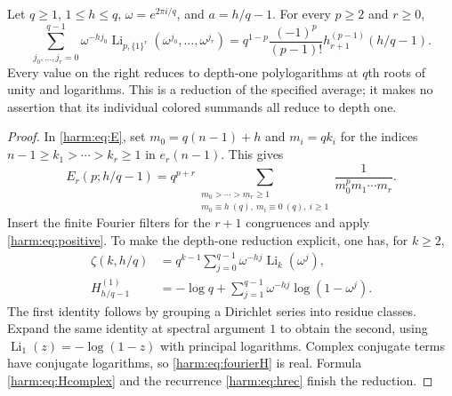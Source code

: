 \begin{corollary}
\label{harm:cor:cyclotomic}
Let $q\geq1$, $1\leq h\leq q$, $\omega=e^{2\pi i/q}$, and
$a=h/q-1$.  For every $p\geq2$ and $r\geq0$,
\begin{equation}\label{harm:eq:projection}
 \sum_{j_0,\ldots,j_r=0}^{q-1}\omega^{-hj_0}
 \operatorname{Li}_{p,\{1\}^r}
       (\omega^{j_0},\ldots,\omega^{j_r})
 =q^{1-p}\frac{(-1)^p}{(p-1)!}
            h_{r+1}^{(p-1)}(h/q-1).
\end{equation}
Every value on the right reduces to depth-one polylogarithms at
$q$th roots of unity and logarithms.  This is a reduction of the
specified average; it makes no assertion that its individual colored
summands all reduce to depth one.
\end{corollary}
\begin{proof}
In \eqref{harm:eq:E}, set $m_0=q(n-1)+h$ and $m_i=qk_i$ for the
indices $n-1\geq k_1>\cdots>k_r\geq1$ in $e_r(n-1)$.  This gives
\[
 E_r(p;h/q-1)=q^{p+r}
 \sum_{\substack{m_0>\cdots>m_r\geq1\\
                  m_0\equiv h\ (q),\ m_i\equiv0\ (q),\ i\geq1}}
 \frac1{m_0^p m_1\cdots m_r}.
\]
Insert the finite Fourier filters for the $r+1$ congruences and
apply \eqref{harm:eq:positive}.  To make the depth-one reduction
explicit, one has, for $k\geq2$,
\begin{align}
 \zeta(k,h/q)
 &=q^{k-1}\sum_{j=0}^{q-1}\omega^{-hj}
                       \operatorname{Li}_k(\omega^j),
                       \label{harm:eq:fourierZ}\\
 H_{h/q-1}^{(1)}
 &=-\log q+\sum_{j=1}^{q-1}\omega^{-hj}\log(1-\omega^j).
                       \label{harm:eq:fourierH}
\end{align}
The first identity follows by grouping a Dirichlet series into residue
classes.  Expand the same identity at spectral argument $1$ to obtain
the second, using $\operatorname{Li}_1(z)=-\log(1-z)$ with principal
logarithms.  Complex conjugate terms have conjugate logarithms, so
\eqref{harm:eq:fourierH} is real.  Formula \eqref{harm:eq:Hcomplex}
and the recurrence \eqref{harm:eq:hrec} finish the reduction.
\end{proof}

